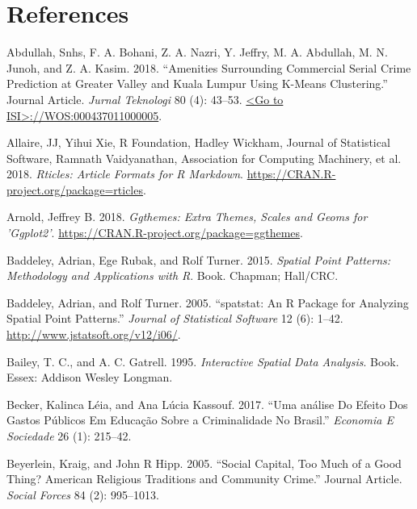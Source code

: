 \documentclass[smallextended]{svjour3}       %
\begin{document}
\hypertarget{references}{%
\section*{References}\label{references}}

\hypertarget{refs}{}
\leavevmode\hypertarget{ref-Abdullah2018amenities}{}%
Abdullah, Snhs, F. A. Bohani, Z. A. Nazri, Y. Jeffry, M. A. Abdullah, M.
N. Junoh, and Z. A. Kasim. 2018. ``Amenities Surrounding Commercial
Serial Crime Prediction at Greater Valley and Kuala Lumpur Using K-Means
Clustering.'' Journal Article. \emph{Jurnal Teknologi} 80 (4): 43--53.
\href{\%3CGo\%20to\%20ISI\%3E://WOS:000437011000005}{\textless{}Go to ISI\textgreater{}://WOS:000437011000005}.

\leavevmode\hypertarget{ref-Allaire2018rticles}{}%
Allaire, JJ, Yihui Xie, R Foundation, Hadley Wickham, Journal of
Statistical Software, Ramnath Vaidyanathan, Association for Computing
Machinery, et al. 2018. \emph{Rticles: Article Formats for R Markdown}.
\url{https://CRAN.R-project.org/package=rticles}.

\leavevmode\hypertarget{ref-Arnold2018}{}%
Arnold, Jeffrey B. 2018. \emph{Ggthemes: Extra Themes, Scales and Geoms
for 'Ggplot2'}. \url{https://CRAN.R-project.org/package=ggthemes}.

\leavevmode\hypertarget{ref-Baddeley2015spatial}{}%
Baddeley, Adrian, Ege Rubak, and Rolf Turner. 2015. \emph{Spatial Point
Patterns: Methodology and Applications with R}. Book. Chapman; Hall/CRC.

\leavevmode\hypertarget{ref-Baddeley2005spatstat}{}%
Baddeley, Adrian, and Rolf Turner. 2005. ``spatstat: An R Package for
Analyzing Spatial Point Patterns.'' \emph{Journal of Statistical
Software} 12 (6): 1--42. \url{http://www.jstatsoft.org/v12/i06/}.

\leavevmode\hypertarget{ref-Bailey1995interactive}{}%
Bailey, T. C., and A. C. Gatrell. 1995. \emph{Interactive Spatial Data
Analysis}. Book. Essex: Addison Wesley Longman.

\leavevmode\hypertarget{ref-Becker2017analise}{}%
Becker, Kalinca Léia, and Ana Lúcia Kassouf. 2017. ``Uma análise Do
Efeito Dos Gastos Públicos Em Educação Sobre a Criminalidade No
Brasil.'' \emph{Economia E Sociedade} 26 (1): 215--42.

\leavevmode\hypertarget{ref-Beyerlein2005social}{}%
Beyerlein, Kraig, and John R Hipp. 2005. ``Social Capital, Too Much of a
Good Thing? American Religious Traditions and Community Crime.'' Journal
Article. \emph{Social Forces} 84 (2): 995--1013.
\end{document}
